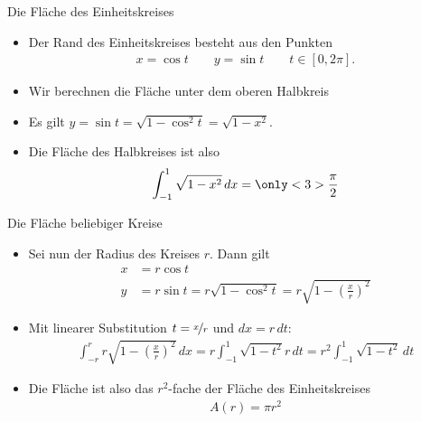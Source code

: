 \begin{frame}{Die Fläche des Einheitskreises}

\begin{itemize}
    \item Der Rand des Einheitskreises besteht aus den Punkten
    \begin{gather*}
            x = \cos t\qquad y = \sin t \qquad t\in [0,2\pi].
    \end{gather*}
    \item Wir berechnen die Fläche unter dem oberen Halbkreis
    \item<2-> Es gilt $y = \sin t = \sqrt{1-\cos^2t} = \sqrt{1-x^2}$.
    \item<2-> Die Fläche des Halbkreises ist also
    \begin{gather*}
        \int_{-1}^1 \sqrt{1-x^2}\,dx = \only<3>{\frac\pi2}
    \end{gather*}
\end{itemize}
\end{frame}

\begin{frame}{Die Fläche beliebiger Kreise}
    \begin{itemize}
        \item Sei nun der Radius des Kreises $r$. Dann gilt
        \begin{align*}
            x &= r \cos t\\
            y &= r \sin t = r\sqrt{1-\cos^2 t} = r \sqrt{1-\left(\tfrac{x}{r}\right)^2}
        \end{align*}
        \item Mit linearer Substitution $t=\nicefrac{x}{r}$ und $dx = r \,dt$:
        \begin{gather*}
            \int_{-r}^r r \sqrt{1-\left(\tfrac{x}{r}\right)^2}\,dx
            = r \int_{-1}^1\sqrt{1-t^2} r \,dt
            = r^2 \int_{-1}^1\sqrt{1-t^2} \,dt
        \end{gather*}
        \item Die Fläche ist also das $r^2$-fache der Fläche des Einheitskreises
        \begin{gather*}
            A(r) = \pi r^2
        \end{gather*}
    \end{itemize}
\end{frame}

